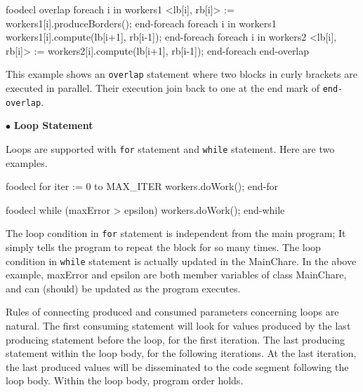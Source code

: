 \documentclass[10pt]{article}
\def\smallfbox#1{{\small {\fbox{#1}}}}
\def\code#1{{\small {\tt {#1}}}}
\begin{document}
\begin{SaveVerbatim}{foodecl}
  overlap
  {
    foreach i in workers1
      <lb[i], rb[i]> := workers1[i].produceBorders();
    end-foreach
    foreach i in workers1
      workers1[i].compute(lb[i+1], rb[i-1]);
    end-foreach
  }
  {
    foreach i in workers2
      <lb[i], rb[i]> := workers2[i].compute(lb[i+1], rb[i-1]);
    end-foreach
  }
  end-overlap
\end{SaveVerbatim}
\vspace{0.1in}
\smallfbox{\BUseVerbatim{foodecl}}
\vspace{0.1in}

This example shows an \code{overlap} statement where two blocks in curly
brackets are executed in parallel. Their execution join back to one at the end
mark of \code{end-overlap}. 

$\bullet$ {\bf Loop Statement}

Loops are supported with \code{for} statement and \code{while} statement. Here
are two examples.
\begin{SaveVerbatim}{foodecl}
  for iter := 0 to MAX_ITER
     workers.doWork();
  end-for
\end{SaveVerbatim}
\vspace{0.1in}
\smallfbox{\BUseVerbatim{foodecl}}
\vspace{0.1in}
  
\begin{SaveVerbatim}{foodecl}
  while (maxError > epsilon)
     workers.doWork();
  end-while
\end{SaveVerbatim}
\vspace{0.1in}
\smallfbox{\BUseVerbatim{foodecl}}
\vspace{0.1in}

The loop condition in \code{for} statement is independent from the main program;
It simply tells the program to repeat the block for so many times. The loop
condition in \code{while} statement is actually updated in the MainChare. In the
above example, maxError and epsilon are both member variables of class
MainChare, and can (should) be updated as the program executes. 

Rules of connecting produced and consumed parameters concerning loops are
natural. The first consuming statement will look for values produced by the last
producing statement before the loop, for the first iteration. The last
producing statement within the loop body, for the following iterations. At the
last iteration, the last produced values will be disseminated to the code
segment following the loop body. Within the loop body, program order holds. 
\end{document}

